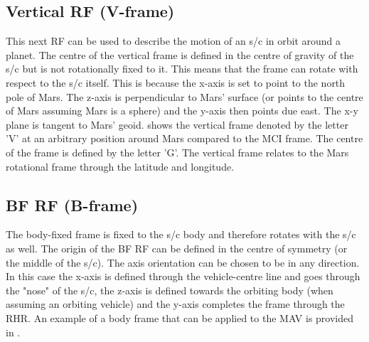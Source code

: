 \subsection{Vertical \ac{RF} (V-frame)}
\label{subsec:VCNE}
This next \ac{RF} can be used to describe the motion of an \ac{s/c} in orbit around a planet. The centre of the vertical frame is defined in the centre of gravity of the \ac{s/c} \citep{mooij2013fd} but is not rotationally fixed to it. This means that the frame can rotate with respect to the \ac{s/c} itself. This is because the x-axis is set to point to the north pole of Mars. The z-axis is perpendicular to Mars' surface (or points to the centre of Mars assuming Mars is a sphere) and the y-axis then points due east. The x-y plane is tangent to Mars' geoid.  shows the vertical frame denoted by the letter 'V' at an arbitrary position around Mars compared to the \ac{MCI} frame. The centre of the frame is defined by the letter 'G'. The vertical frame relates to the Mars rotational frame through the latitude and longitude. 




\subsection{\acl{BF} \ac{RF} (B-frame)}
\label{subsec:BF}
The body-fixed  frame is fixed to the \ac{s/c} body and therefore rotates with the \ac{s/c} as well. The origin of the \ac{BF} \ac{RF} can be defined in the centre of symmetry (or the middle of the \ac{s/c}). The axis orientation can be chosen to be in any direction. In this case the x-axis is defined through the vehicle-centre line and goes through the "nose" of the \ac{s/c}, the z-axis is defined towards the orbiting body (when assuming an orbiting vehicle) and the y-axis completes the frame through the \ac{RHR}. An example of a body frame that can be applied to the \ac{MAV} is provided in . 

